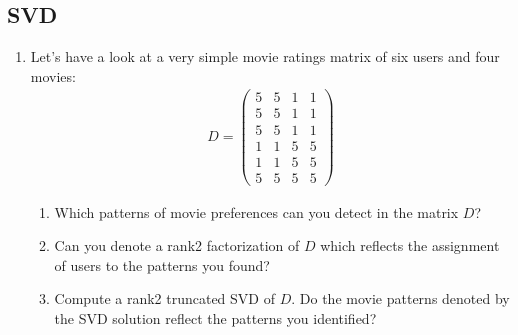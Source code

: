 \documentclass[letterpaper,10pt,english]{jupyterBook}
\begin{document}
\subsection{SVD}
\label{\detokenize{dim_reduction_exercises:svd}}\begin{enumerate}
%
\item {} 
\sphinxAtStartPar
Let’s have a look at a very simple movie ratings matrix of six users and four movies:
\begin{align*}
    D=\begin{pmatrix}
        5 & 5 & 1 & 1\\
    5 & 5 & 1 & 1\\
    5 & 5 & 1 & 1\\
    1 & 1 & 5 & 5\\
    1 & 1 & 5 & 5\\
    5 & 5 & 5 & 5
    \end{pmatrix}
    \end{align*}\begin{enumerate}
%
\item {} 
\sphinxAtStartPar
Which patterns of movie preferences can you detect in the matrix \(D\)?

\item {} 
\sphinxAtStartPar
Can you denote a rank\sphinxhyphen{}2 factorization of \(D\) which reflects the assignment of users  to the patterns you found?

\item {} 
\sphinxAtStartPar
Compute a rank\sphinxhyphen{}2 truncated SVD of \(D\). Do the movie patterns denoted by the SVD  solution reflect the patterns you identified?

\end{enumerate}


\end{enumerate}
\end{document}
